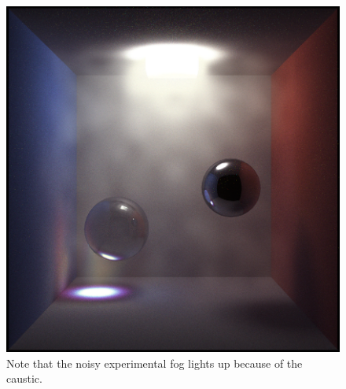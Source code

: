 \documentclass[12pt]{article}
\begin{document}
\begin{figure} 
\centering
  \includegraphics[width = 6 in]{fog3.png}
  \caption{ Note that the noisy experimental fog lights up because of the caustic.
}
\end{figure}
\end{document}
